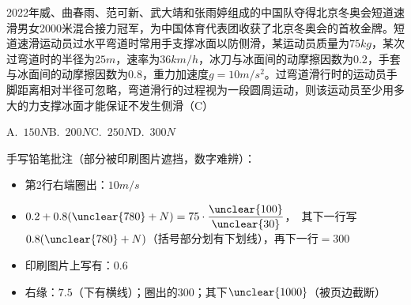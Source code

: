 \begin{problem}[贴纸印刷题]
2022年威、曲春雨、范可新、武大靖和张雨婷组成的中国队夺得北京冬奥会短道速滑男女2000米混合接力冠军，为中国体育代表团收获了北京冬奥会的首枚金牌。短道速滑运动员过水平弯道时常用手支撑冰面以防侧滑，某运动员质量为$75\unit{kg}$，某次过弯道时的半径为$25\unit{m}$，速率为$36\unit{km/h}$，冰刀与冰面间的动摩擦因数为$0.2$，手套与冰面间的动摩擦因数为$0.8$，重力加速度$g=10\unit{m/s^2}$。过弯道滑行时的运动员手脚距离相对半径可忽略，弯道滑行的过程视为一段圆周运动，则该运动员至少用多大的力支撑冰面才能保证不发生侧滑（C） %

A.\ $150\unit{N}$\qquad B.\ $200\unit{N}$\qquad C.\ $250\unit{N}$\qquad D.\ $300\unit{N}$

手写铅笔批注（部分被印刷图片遮挡，数字难辨）：
\begin{itemize}
\item 第2行右端圈出：$10\unit{m/s}$
\item $0.2+0.8(\unclear{780}+N)=75\cdot\dfrac{\unclear{100}}{\unclear{30}}$，\ 其下一行写$0.8(\unclear{780}+N)$（括号部分划有下划线），再下一行$=300$ %
\item 印刷图片上写有：$0.6$
\item 右缘：$7.5$（下有横线）；圈出的$300$；其下$\unclear{1000}$（被页边截断）
\end{itemize}
\end{problem}
